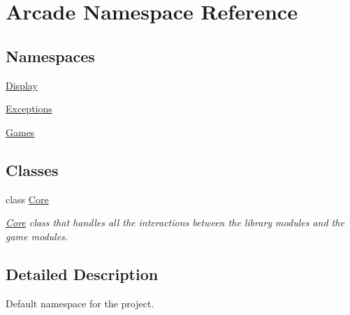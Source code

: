\hypertarget{namespaceArcade}{}\section{Arcade Namespace Reference}
\label{namespaceArcade}
\subsection*{Namespaces}
\begin{DoxyCompactItemize}
\item 
 \mbox{\hyperlink{namespaceArcade_1_1Display}{Display}}
\item 
 \mbox{\hyperlink{namespaceArcade_1_1Exceptions}{Exceptions}}
\item 
 \mbox{\hyperlink{namespaceArcade_1_1Games}{Games}}
\end{DoxyCompactItemize}
\subsection*{Classes}
\begin{DoxyCompactItemize}
\item 
class \mbox{\hyperlink{classArcade_1_1Core}{Core}}
\begin{DoxyCompactList}\small\item\em \mbox{\hyperlink{classArcade_1_1Core}{Core}} class that handles all the interactions between the library modules and the game modules. \end{DoxyCompactList}\end{DoxyCompactItemize}


\subsection{Detailed Description}
Default namespace for the project. 
